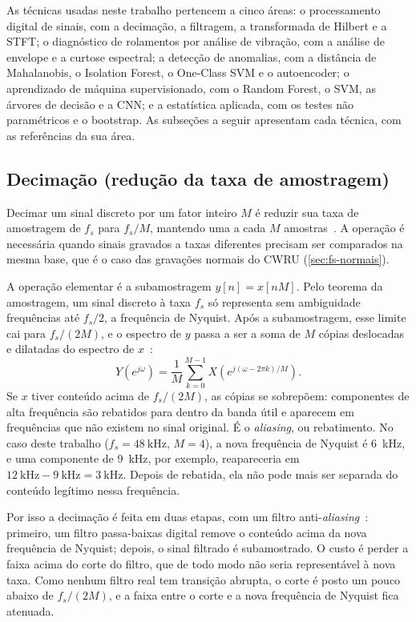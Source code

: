 As técnicas usadas neste trabalho pertencem a cinco áreas: o processamento
digital de sinais, com a decimação, a filtragem, a transformada de Hilbert e a
STFT; o diagnóstico de rolamentos por análise de vibração, com a análise de
envelope e a curtose espectral; a detecção de anomalias, com a distância de
Mahalanobis, o Isolation Forest, o One-Class SVM e o autoencoder; o aprendizado
de máquina supervisionado, com o Random Forest, o SVM, as árvores de decisão e a
CNN; e a estatística aplicada, com os testes não paramétricos e o bootstrap. As
subseções a seguir apresentam cada técnica, com as referências da sua área.

\subsection{Decimação (redução da taxa de amostragem)}
\label{sec:decimacao}

Decimar um sinal discreto por um fator inteiro $M$ é reduzir sua taxa de
amostragem de $f_s$ para $f_s/M$, mantendo uma a cada $M$
amostras~\cites[cap.~4]{oppenheim2010}{proakis2007}. A operação é necessária quando sinais
gravados a taxas diferentes precisam ser comparados na mesma base, que é o caso
das gravações normais do CWRU (\autoref{sec:fs-normais}).

A operação elementar é a subamostragem $y[n] = x[nM]$. Pelo teorema da amostragem, um sinal discreto à
taxa $f_s$ só representa sem ambiguidade frequências até $f_s/2$, a frequência de
Nyquist. Após a subamostragem, esse limite cai para $f_s/(2M)$, e o espectro de
$y$ passa a ser a soma de $M$ cópias deslocadas e dilatadas do espectro de
$x$~\cite[cap.~4]{oppenheim2010}:
\begin{equation}
  Y(e^{j\omega}) = \frac{1}{M}\sum_{k=0}^{M-1} X\!\left(e^{j(\omega - 2\pi k)/M}\right).
\end{equation}
Se $x$ tiver conteúdo acima de $f_s/(2M)$, as cópias se sobrepõem: componentes de
alta frequência são rebatidos para dentro da banda útil e aparecem em frequências
que não existem no sinal original. É o \emph{aliasing}, ou rebatimento. No caso
deste trabalho ($f_s = \SI{48}{\kilo\hertz}$, $M = 4$), a nova frequência de
Nyquist é \SI{6}{\kilo\hertz}, e uma componente de \SI{9}{\kilo\hertz}, por
exemplo, reapareceria em $\SI{12}{\kilo\hertz} - \SI{9}{\kilo\hertz} =
\SI{3}{\kilo\hertz}$. Depois de rebatida, ela não pode mais ser separada do
conteúdo legítimo nessa frequência.

Por isso a decimação é feita em duas etapas, com um filtro
anti-\emph{aliasing}~\cite[cap.~4]{oppenheim2010}: primeiro, um filtro passa-baixas
digital remove o conteúdo acima da nova frequência de Nyquist; depois, o sinal
filtrado é subamostrado. O custo é perder a faixa acima do corte do filtro, que
de todo modo não seria representável à nova taxa. Como nenhum filtro real tem
transição abrupta, o corte é posto um pouco abaixo de $f_s/(2M)$, e a faixa entre
o corte e a nova frequência de Nyquist fica atenuada.

